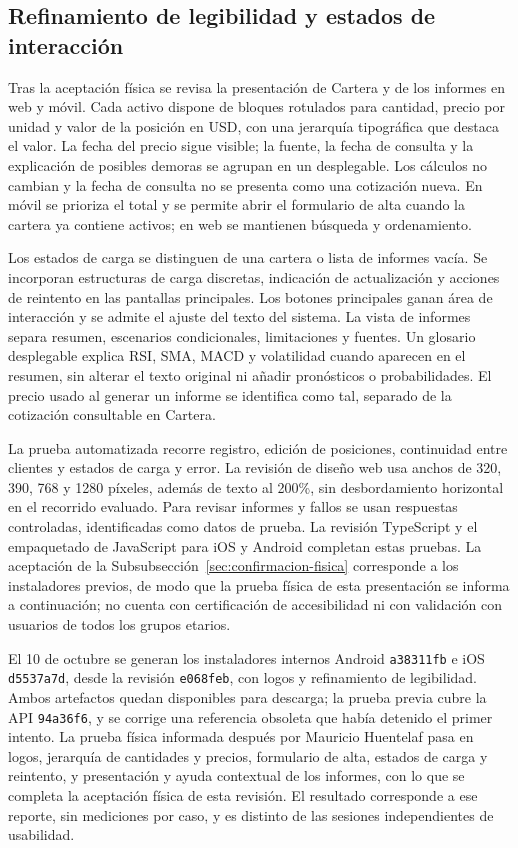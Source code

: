 \subsection{Refinamiento de legibilidad y estados de interacción}\label{sec:refinamiento-legibilidad}

Tras la aceptación física se revisa la presentación de Cartera y de los informes en web y móvil. Cada activo dispone de bloques rotulados para cantidad, precio por unidad y valor de la posición en USD, con una jerarquía tipográfica que destaca el valor. La fecha del precio sigue visible; la fuente, la fecha de consulta y la explicación de posibles demoras se agrupan en un desplegable. Los cálculos no cambian y la fecha de consulta no se presenta como una cotización nueva. En móvil se prioriza el total y se permite abrir el formulario de alta cuando la cartera ya contiene activos; en web se mantienen búsqueda y ordenamiento.

Los estados de carga se distinguen de una cartera o lista de informes vacía. Se incorporan estructuras de carga discretas, indicación de actualización y acciones de reintento en las pantallas principales. Los botones principales ganan área de interacción y se admite el ajuste del texto del sistema. La vista de informes separa resumen, escenarios condicionales, limitaciones y fuentes. Un glosario desplegable explica RSI, SMA, MACD y volatilidad cuando aparecen en el resumen, sin alterar el texto original ni añadir pronósticos o probabilidades. El precio usado al generar un informe se identifica como tal, separado de la cotización consultable en Cartera.

La prueba automatizada recorre registro, edición de posiciones, continuidad entre clientes y estados de carga y error. La revisión de diseño web usa anchos de 320, 390, 768 y 1280 píxeles, además de texto al 200\%, sin desbordamiento horizontal en el recorrido evaluado. Para revisar informes y fallos se usan respuestas controladas, identificadas como datos de prueba. La revisión TypeScript y el empaquetado de JavaScript para iOS y Android completan estas pruebas. La aceptación de la Subsubsección~\ref{sec:confirmacion-fisica} corresponde a los instaladores previos, de modo que la prueba física de esta presentación se informa a continuación; no cuenta con certificación de accesibilidad ni con validación con usuarios de todos los grupos etarios.

El 10 de octubre se generan los instaladores internos Android \texttt{a38311fb} e iOS \texttt{d5537a7d}, desde la revisión \texttt{e068feb}, con logos y refinamiento de legibilidad. Ambos artefactos quedan disponibles para descarga; la prueba previa cubre la API \texttt{94a36f6}, y se corrige una referencia obsoleta que había detenido el primer intento. La prueba física informada después por Mauricio Huentelaf pasa en logos, jerarquía de cantidades y precios, formulario de alta, estados de carga y reintento, y presentación y ayuda contextual de los informes, con lo que se completa la aceptación física de esta revisión. El resultado corresponde a ese reporte, sin mediciones por caso, y es distinto de las sesiones independientes de usabilidad.

